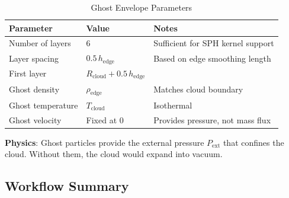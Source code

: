 \documentclass[11pt,a4paper]{article}
\begin{document}
\begin{table}[h]
\centering
\caption{Ghost Envelope Parameters}
\begin{tabular}{lll}
\toprule
\textbf{Parameter} & \textbf{Value} & \textbf{Notes} \\
\midrule
Number of layers & 6 & Sufficient for SPH kernel support \\
Layer spacing & $0.5\,h_\mathrm{edge}$ & Based on edge smoothing length \\
First layer & $R_\mathrm{cloud} + 0.5\,h_\mathrm{edge}$ & \\
Ghost density & $\rho_\mathrm{edge}$ & Matches cloud boundary \\
Ghost temperature & $T_\mathrm{cloud}$ & Isothermal \\
Ghost velocity & Fixed at 0 & Provides pressure, not mass flux \\
\bottomrule
\end{tabular}
\end{table}

\textbf{Physics}: Ghost particles provide the external pressure $P_\mathrm{ext}$
that confines the cloud. Without them, the cloud would expand into vacuum.

\subsection{Workflow Summary}
\end{document}
